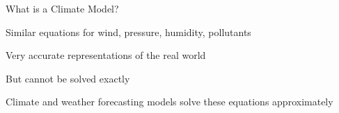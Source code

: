 \begin{slide}{What is a Climate Model?}
\begin{list0}
\item Similar equations for wind, pressure, humidity, pollutants

\item Very accurate representations of the real world

\item But cannot be solved exactly

\item Climate and weather forecasting models solve these equations approximately

\end{list0}

\end{slide}
